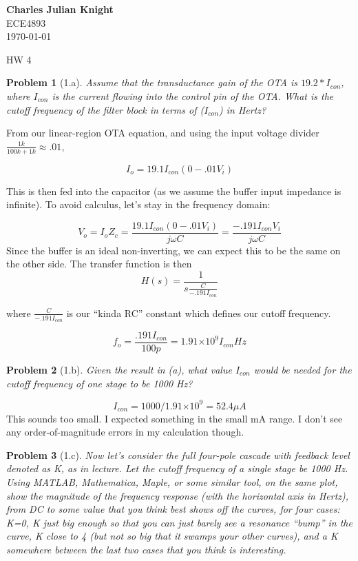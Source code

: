 \documentclass[12pt]{article}
\providecommand{\e}[1]{\ensuremath{\times 10^{#1}}}
\providecommand{\jw}[0]{\ensuremath{j \omega}}
\newtheorem*{prob}{Problem}
\begin{document}
\begin{flushright}
\textbf{Charles Julian Knight}\\
ECE4893\\
\today
\end{flushright}


\begin{center}
\huge HW 4
\end{center}

\begin{prob}[1.a]{
Assume that the transductance gain of the OTA is $19.2*I_{con}$, where $I_{con}$ is the current flowing into the control pin of the OTA. What is the cutoff frequency of the filter block in terms of ($I_{con}$) in Hertz?
}\end{prob}
From our linear-region OTA equation, and using the input voltage divider $\frac{1k}{100k+1k}\approx .01$,

\[I_o = 19.1 I_{con}(0-.01 V_i)\]

This is then fed into the capacitor (as we assume the buffer input impedance is infinite). To avoid calculus, let's stay in the
frequency domain:

\[V_o = I_o Z_c = \frac{19.1 I_{con}(0-.01 V_i)}{\jw C} = \frac{-.191 I_{con}V_i}{\jw C}\]
Since the buffer is an ideal non-inverting, we can expect this to be the same on the other side. The transfer function is then
\[H(s) = \frac{1}{s \frac{C}{-.191I_{con}}}\]

where $\frac{C}{-.191I_{con}}$ is our ``kinda RC'' constant which defines our cutoff frequency.

\[f_o = \frac{.191I_{con}}{100p} = 1.91\e{9}I_{con} Hz \]

\begin{prob}[1.b]{
Given the result in (a), what value $I_{con}$ would be needed for the cutoff frequency of one stage to be 1000 Hz?
}\end{prob}
\[I_{con} = 1000/1.91\e{9} = 52.4 \mu A \]
This sounds too small. I expected something in the small mA range. I don't see any order-of-magnitude errors in my calculation though.

\begin{prob}[1.c]{
Now let's consider the full four-pole cascade with feedback level denoted as K, as in lecture. Let the cutoff frequency of a single stage be 1000 Hz. Using MATLAB, Mathematica, Maple, or some similar tool, on the same plot, show the magnitude of the frequency response (with the horizontal axis in Hertz), from DC to some value that you think best shows off the curves, for four cases: K=0, K just big enough so that you can just barely see a resonance ``bump'' in the curve, K close to 4 (but not so big that it swamps your other curves), and a K somewhere between the last two cases that you think is interesting.
}\end{prob}
\end{document}
